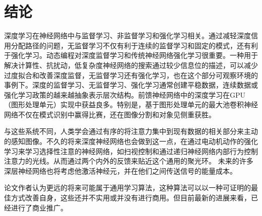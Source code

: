 \documentclass[10pt,journal,compsoc]{IEEEtran}
\begin{document}
\section{结论}
深度学习在神经网络中与监督学习、非监督学习和强化学习相关。通过减轻深度信用分配路径的问题，无监督学习不仅有利于连续的监督学习和固定的模式，还有利于强化学习。动态编程对深度监督学习和传统神经网络强化学习很重要。一种用于解决计算性、抗扰动，低复杂度神经网络的搜索通过较少信息位的描述，可以减少过度拟合和改善深度监督，无监督学习还有强化学习，也在这个部分可观察环境的事例下。深度的监督学习、无监督学习、强化学习通常创建平稳数据，连续数据或强化学习政策的越来越抽象表示层次结构。前馈神经网络中的深度学习在GPU（图形处理单元）实现中获益良多。特别是，基于图形处理单元的最大池卷积神经网络不仅在模式识别中赢得比赛，还在图像分割和对象见侧重获胜。\par
与这些系统不同，人类学会通过有序的将注意力集中到现有数据的相关部分来主动的感知图像。不久的将来深度神经网络也会做到这一点，在通过电动机动作的强化学习来学习选择性注意的神经网络，如扫视控制和通过递归神经网络内部行为控制注意力的光线。从而通过两个内外的反馈来贴近这个通用的聚光环。
未来的许多深层神经网络也将考虑他激活神经元，并在他们之间传送信号的能量成本。\par
论文作者认为更远的将来可能属于通用学习算法，这种算法可以以一种可证明的最佳方式改善自身，这些还并不实用或并没有进行商用。但目前最新的进展来看，已经进行了商业推广。


\appendices
\end{document}
